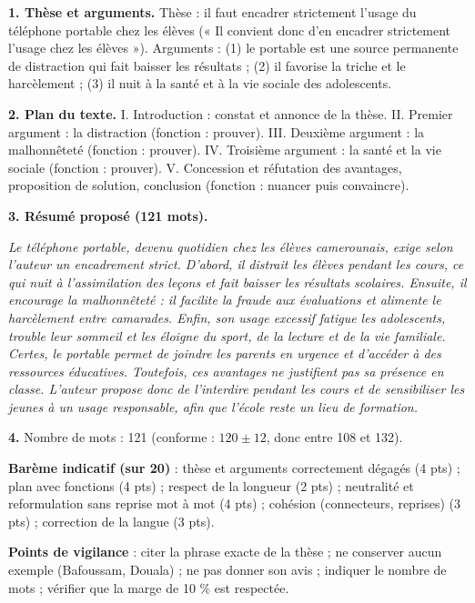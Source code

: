 \documentclass[11pt]{article}
\begin{document}
\begin{corrige}
\textbf{1. Thèse et arguments.} Thèse : il faut encadrer strictement l'usage du téléphone portable chez les élèves (« Il convient donc d'en encadrer strictement l'usage chez les élèves »). Arguments : (1) le portable est une source permanente de distraction qui fait baisser les résultats ; (2) il favorise la triche et le harcèlement ; (3) il nuit à la santé et à la vie sociale des adolescents.

\textbf{2. Plan du texte.} I. Introduction : constat et annonce de la thèse. II. Premier argument : la distraction (fonction : prouver). III. Deuxième argument : la malhonnêteté (fonction : prouver). IV. Troisième argument : la santé et la vie sociale (fonction : prouver). V. Concession et réfutation des avantages, proposition de solution, conclusion (fonction : nuancer puis convaincre).

\textbf{3. Résumé proposé (121 mots).}

\emph{Le téléphone portable, devenu quotidien chez les élèves camerounais, exige selon l'auteur un encadrement strict. D'abord, il distrait les élèves pendant les cours, ce qui nuit à l'assimilation des leçons et fait baisser les résultats scolaires. Ensuite, il encourage la malhonnêteté : il facilite la fraude aux évaluations et alimente le harcèlement entre camarades. Enfin, son usage excessif fatigue les adolescents, trouble leur sommeil et les éloigne du sport, de la lecture et de la vie familiale. Certes, le portable permet de joindre les parents en urgence et d'accéder à des ressources éducatives. Toutefois, ces avantages ne justifient pas sa présence en classe. L'auteur propose donc de l'interdire pendant les cours et de sensibiliser les jeunes à un usage responsable, afin que l'école reste un lieu de formation.}

\textbf{4.} Nombre de mots : 121 (conforme : $120 \pm 12$, donc entre 108 et 132).

\textbf{Barème indicatif (sur 20)} : thèse et arguments correctement dégagés (4 pts) ; plan avec fonctions (4 pts) ; respect de la longueur (2 pts) ; neutralité et reformulation sans reprise mot à mot (4 pts) ; cohésion (connecteurs, reprises) (3 pts) ; correction de la langue (3 pts).

\textbf{Points de vigilance} : citer la phrase exacte de la thèse ; ne conserver aucun exemple (Bafoussam, Douala) ; ne pas donner son avis ; indiquer le nombre de mots ; vérifier que la marge de 10 \% est respectée.
\end{corrige}
\end{document}
